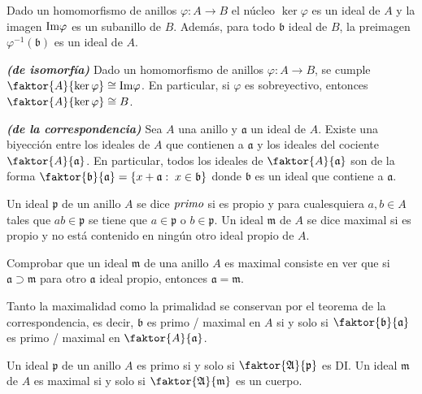 \documentclass[./main.tex]{subfiles}
\begin{document}
Dado un homomorfismo de anillos $\varphi:A\to B$ el núcleo $\ker \varphi$ es un ideal de $A$ y la imagen $\text{Im} \varphi$ es un subanillo de $B$. Además, para todo $\mathfrak b$ ideal de $B$, la preimagen $\varphi^{-1}(\mathfrak b)$ es un ideal de $A$.

\begin{theorem} \textbf{\emph{(de isomorfía)}}
Dado un homomorfismo de anillos $\varphi:A\to B$, se cumple $\faktor{A}{\ker \varphi} \cong \im \varphi$. En particular, si $\varphi$ es sobreyectivo, entonces $\faktor{A}{\ker \varphi} \cong B$.
\end{theorem}

\begin{theorem} \textbf{\emph{(de la correspondencia)}}
Sea $A$ una anillo y $\mathfrak a$ un ideal de $A$. Existe una biyección entre los ideales de $A$ que contienen a $\mathfrak a$ y los ideales del cociente $\faktor{A}{\mathfrak a}$. En particular, todos los ideales de $\faktor{A}{\mathfrak a}$ son de la forma  $\faktor{\mathfrak b}{\mathfrak a} = \{ x + \mathfrak a:\; x \in \mathfrak b \}$ donde $\mathfrak b$ es un ideal que contiene a $\mathfrak a$.
\end{theorem}

\begin{definition}
Un ideal $\mathfrak p$ de un anillo $A$ se dice $\emph {primo}$ si es propio y para cualesquiera $a,b \in A$ tales que $ab \in \mathfrak p$ se tiene que $a\in \mathfrak p$ o $b \in  \mathfrak p$. Un ideal $\mathfrak m $ de $A$ se dice maximal si es propio y no está contenido en ningún otro ideal propio de $A$.
\end{definition}

Comprobar que un ideal $\mathfrak m$ de una anillo $A$ es maximal consiste en ver que si $\mathfrak a \supset \mathfrak m$ para otro $\mathfrak a$ ideal propio, entonces $\mathfrak a = \mathfrak m$.

Tanto la maximalidad como la primalidad se conservan por el teorema de la correspondencia, es decir, $\mathfrak b $ es primo / maximal en $A$ si y solo si $\faktor{\mathfrak b}{\mathfrak a}$ es primo / maximal en $\faktor{A}{\mathfrak a}$.

\begin{proposition}
Un ideal $\mathfrak p$ de un anillo $A$ es primo si y solo si $\faktor{\mathfrak A}{ \mathfrak p }$ es DI. Un ideal $\mathfrak m$ de $A$ es maximal si y solo si $\faktor{\mathfrak A}{\mathfrak m}$ es un cuerpo.
\end{proposition}
\end{document}
